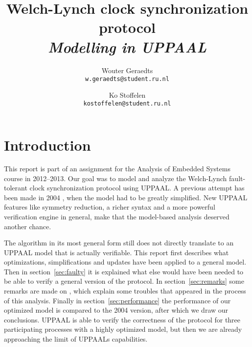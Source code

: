 \documentclass[a4paper,10pt]{article}
\title{Welch-Lynch clock synchronization protocol \\\textit{Modelling in UPPAAL}}
\author{
	Wouter Geraedts \\ \small{\texttt{w.geraedts@student.ru.nl}} \and
	Ko Stoffelen     \\ \small{\texttt{kostoffelen@student.ru.nl}}
}
\date{}
\newcommand{\UPPAAL}{UPPAAL\xspace}
\begin{document}
	\maketitle






\section{Introduction}


This report is part of an assignment for the Analysis of Embedded Systems course in 2012--2013. Our goal was to model and analyze the Welch-Lynch fault-tolerant clock synchronization protocol \cite{Welch1984Anew} using \UPPAAL. A previous attempt has been made in 2004 \cite{Aceto2004Notes}, when the model had to be greatly simplified. New \UPPAAL features like symmetry reduction, a richer syntax and a more powerful verification engine in general, make that the model-based analysis deserved another chance.

The algorithm in its most general form still does not directly translate to an \UPPAAL model that is actually verifiable. This report first describes what optimizations, simplifications and updates have been applied to a general model. Then in section~\ref{sec:faulty} it is explained what else would have been needed to be able to verify a general version of the protocol. In section~\ref{sec:remarks} some remarks are made on \cite{Aceto2004Notes}, which explain some troubles that appeared in the process of this analysis. Finally in section~\ref{sec:performance} the performance of our optimized model is compared to the 2004 version, after which we draw our conclusions. \UPPAAL is able to verify the correctness of the protocol for three participating processes with a highly optimized model, but then we are already approaching the limit of \UPPAAL{}s capabilities.
\end{document}
